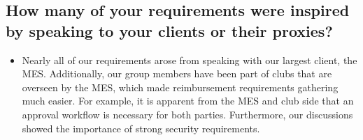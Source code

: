 \documentclass[12pt]{article}
\begin{document}
\begin{enumerate}
  \subsection{How many of your requirements were inspired by speaking to your clients or their proxies?}
    \begin{itemize}
      \item Nearly all of our requirements arose from speaking with our largest client, the MES. Additionally, our group members have been part of clubs that are overseen by the MES, which made reimbursement requirements gathering much easier. For example, it is apparent from the MES and club side that an approval workflow is necessary for both parties. Furthermore, our discussions showed the importance of strong security requirements.
    \end{itemize}


\end{enumerate}
\end{document}
